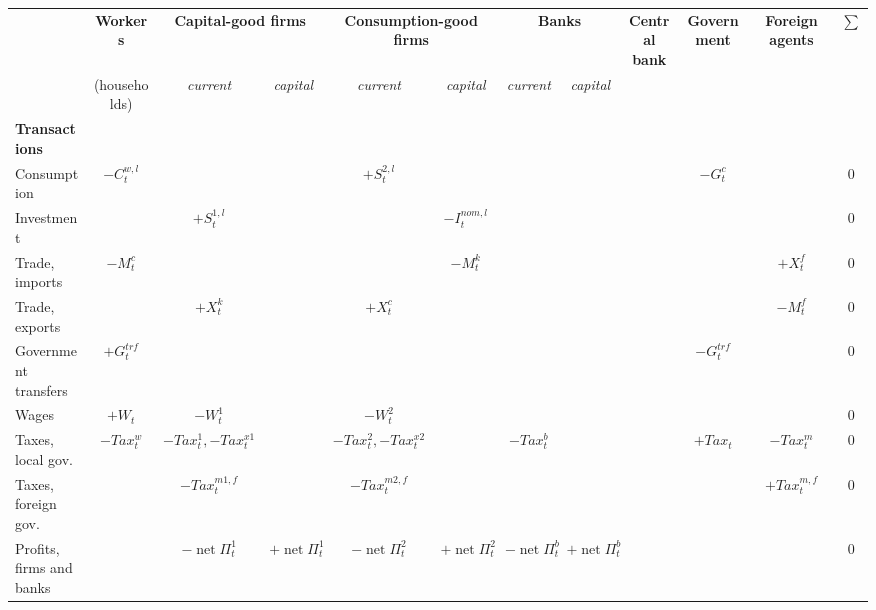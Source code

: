 \documentclass[a4paper,11pt]{article}
\begin{document}
\begin{appendices}
\begin{landscape}
\begin{table}
\centering
\tiny
\renewcommand{\arraystretch}{1.5}
\setlength\tabcolsep{3pt} %
\newcommand{\net}{\operatorname{net}}
\begin{tabular}{l|c|c|c|c|c|c|c|c|c|c|c}
\toprule
							& \textbf{Workers}				& \multicolumn{2}{c|}{\textbf{Capital-good firms}}		& \multicolumn{2}{c|}{\textbf{Consumption-good firms}}	& \multicolumn{2}{c|}{\textbf{Banks}}							& \textbf{Central bank}					& \textbf{Government}				& \textbf{Foreign agents}	& \textbf{$\sum$} \\
							& (households)					& \textit{current}				& \textit{capital}		& \textit{current}				& \textit{capital}		& \textit{current}					& \textit{capital}			&										&									&							& \\
\hline
\textbf{Transactions}		&								&								&						&								&						&									&							&										&									&							& \\
Consumption					& $-C_t^{w,l}$					& 								&						& $+S^{2,l}_t$					&						&									&							&										& $-G_t^c$							&							& $0$ \\
Investment					&								& $+S^{1,l}_t$					&						&								& $-I^{nom,l}_t$		&									&							&										&									&							& $0$ \\
Trade, imports				& $-M^c_t$						& 								&						&								& $-M^k_t$				&									&							&										&									& $+X^f_t$					& $0$ \\
Trade, exports				&								& $+X^k_t$						&						& $+X^c_t$						&						&									&							&										&									& $-M^f_t$					& $0$ \\
Government transfers		& $+G_t^{trf}$					&								&						&								&						&									&							&										& $-G_t^{trf}$						&							& $0$ \\
Wages						& $+W_t$						& $-W^1_t$						&						& $-W^2_t$						&						&									&							&										&									&							& $0$ \\
Taxes, local gov.			& $-Tax^w_t$					& $-Tax^1_t, -Tax^{x1}_t$		&						& $-Tax^2_t, -Tax^{x2}_t$		&						& $-Tax^b_t$						&							&										& $+Tax_t$							& $-Tax^m_t$				& $0$ \\
Taxes, foreign gov.			&								& $-Tax^{m1,f}_t$				&						& $-Tax^{m2,f}_t$				&						&									&							&										&									& $+Tax^{m,f}_t$			& $0$ \\
Profits, firms and banks	&								& $-\net \Pi^1_t$				& $+\net \Pi^1_t$		& $-\net \Pi^2_t$				& $+\net \Pi^2_t$		& $-\net \Pi^b_t$					& $+\net \Pi^b_t$			&										&									&							& $0$ \\

\end{tabular}
\end{table}
\end{landscape}
\end{appendices}
\end{document}
